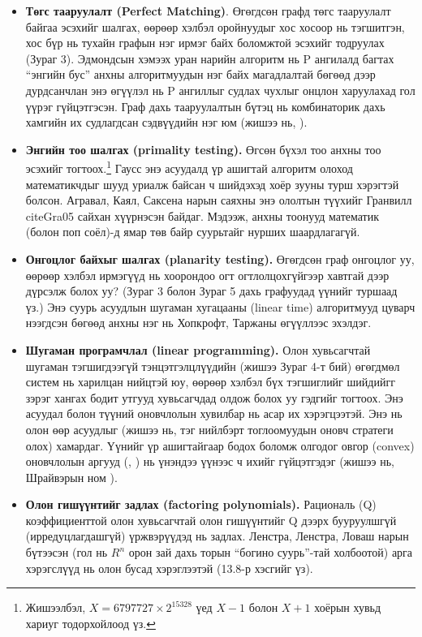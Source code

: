 \begin{itemize}
  \item \textbf{Төгс тааруулалт (Perfect Matching)}. Өгөгдсөн графд төгс тааруулалт байгаа эсэхийг шалгах, өөрөөр хэлбэл оройнуудыг хос хосоор нь тэгшитгэн, хос бүр нь тухайн графын нэг ирмэг байх боломжтой эсэхийг тодруулах (Зураг 3). Эдмондсын \cite{Edm65b} хэмээх уран нарийн алгоритм нь P ангилалд багтах “энгийн бус” анхны алгоритмуудын нэг байх магадлалтай бөгөөд дээр дурдсанчлан энэ өгүүлэл нь P ангиллыг судлах чухлыг онцлон харуулахад гол үүрэг гүйцэтгэсэн. Граф дахь тааруулалтын бүтэц нь комбинаторик дахь хамгийн их судлагдсан сэдвүүдийн нэг юм (жишээ нь, \cite{LP09}).
  \item \textbf{Энгийн тоо шалгах (primality testing).} Өгсөн бүхэл тоо анхны тоо эсэхийг тогтоох.\footnote{Жишээлбэл, $X = 6797727 × 2^15328$ үед $X − 1$ болон $X + 1$ хоёрын хувьд хариуг тодорхойлоод үз.} Гаусс энэ асуудалд үр ашигтай алгоритм олоход математикчдыг шууд уриалж байсан ч шийдэхэд хоёр зууны турш хэрэгтэй болсон. Агравал, Каял, Саксена нарын \cite{AKS04} саяхны энэ ололтын түүхийг Гранвилл cite{Gra05} сайхан хүүрнэсэн байдаг. Мэдээж, анхны тоонууд математик (болон поп соёл)-д ямар төв байр суурьтайг нурших шаардлагагүй.
  \item \textbf{Онгоцлог байхыг шалгах (planarity testing).} Өгөгдсөн граф онгоцлог уу, өөрөөр хэлбэл ирмэгүүд нь хоорондоо огт огтлолцохгүйгээр хавтгай дээр дүрсэлж болох уу? (Зураг 3 болон Зураг 5 дахь графуудад үүнийг туршаад үз.) Энэ суурь асуудлын шугаман хугацааны (linear time) алгоритмууд цуварч нээгдсэн бөгөөд анхны нэг нь Хопкрофт, Таржаны \cite{HT74} өгүүллээс эхэлдэг.
  \item \textbf{Шугаман програмчлал (linear programming).} Олон хувьсагчтай шугаман тэгшигдээгүй тэнцэтгэлцлүүдийн (жишээ Зураг 4-т бий) өгөгдмөл систем нь харилцан нийцтэй юу, өөрөөр хэлбэл бүх тэгшиглийг шийдийгг зэрэг хангах бодит утгууд хувьсагчдад олдож болох уу гэдгийг тогтоох. Энэ асуудал болон түүний оновчлолын хувилбар нь асар их хэрэгцээтэй. Энэ нь олон өөр асуудлыг (жишээ нь, тэг нийлбэрт тоглоомуудын оновч стратеги олох) хамардаг. Үүнийг үр ашигтайгаар бодох боломж олгодог овгор (convex) оновчлолын аргууд (\cite{Kha79}, \cite{Kar84}) нь үнэндээ үүнээс ч ихийг гүйцэтгэдэг (жишээ нь, Шрайвэрын ном \cite{Sch03}).
  \item \textbf{Олон гишүүнтийг задлах (factoring polynomials).} Рациональ (Q) коэффициенттой олон хувьсагчтай олон гишүүнтийг Q дээрх бууруулшгүй (ирредуцлагдашгүй) үржвэрүүдэд нь задлах. Ленстра, Ленстра, Ловаш нарын \cite{LLL82} бүтээсэн (гол нь $R^n$ орон зай дахь торын “богино суурь”-тай холбоотой) арга хэрэгслүүд нь олон бусад хэрэглээтэй (13.8-р хэсгийг үз).

\end{itemize}
